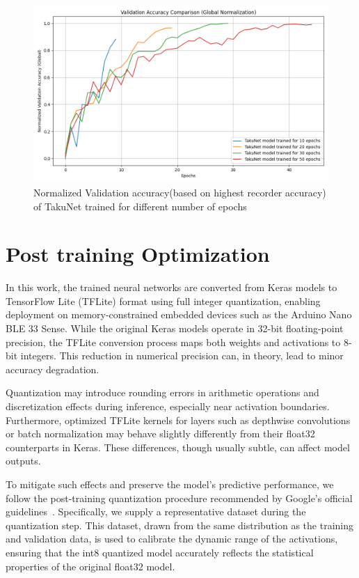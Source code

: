 \begin{figure}[ht]
    \centering
    \includegraphics[width=0.85\linewidth]{Pictures/val_accuracy_comparison_global.png}
    \caption{Normalized Validation accuracy(based on highest recorder accuracy) of TakuNet trained for different number of epochs }
    \label{fig:val_accuracy_diff_epochs}
\end{figure}

\section{Post training Optimization}


In this work, the trained neural networks are converted from Keras models to TensorFlow Lite (TFLite) format using full integer quantization, enabling deployment on memory-constrained embedded devices such as the Arduino Nano BLE 33 Sense. While the original Keras models operate in 32-bit floating-point precision, the TFLite conversion process maps both weights and activations to 8-bit integers. This reduction in numerical precision can, in theory, lead to minor accuracy degradation.

Quantization may introduce rounding errors in arithmetic operations and discretization effects during inference, especially near activation boundaries. Furthermore, optimized TFLite kernels for layers such as depthwise convolutions or batch normalization may behave slightly differently from their float32 counterparts in Keras. These differences, though usually subtle, can affect model outputs.

To mitigate such effects and preserve the model's predictive performance, we follow the post-training quantization procedure recommended by Google’s official guidelines~\cite{tensorflow2023quantization}. Specifically, we supply a representative dataset during the quantization step. This dataset, drawn from the same distribution as the training and validation data, is used to calibrate the dynamic range of the activations, ensuring that the int8 quantized model accurately reflects the statistical properties of the original float32 model.

